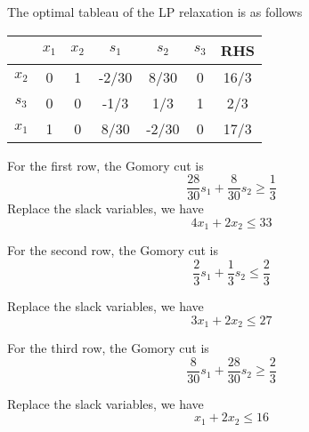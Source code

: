                 The optimal tableau of the LP relaxation is as follows

                \begin{table}[H]
                    \centering
                    \begin{tabular}{c|ccccc|c}
                        & $x_1$ & $x_2$ & $s_1$ & $s_2$ & $s_3$ & RHS\\
                        \hline
                        $x_2$ & 0 & 1 & -2/30 & 8/30 & 0 & 16/3\\
                        $s_3$ & 0 & 0 & -1/3 & 1/3 & 1 & 2/3\\
                        $x_1$ & 1 & 0 & 8/30 & -2/30 & 0 & 17/3
                    \end{tabular}
                \end{table}

                For the first row, the Gomory cut is
                \begin{equation*}
                    \frac{28}{30} s_1 + \frac{8}{30} s_2 \ge \frac{1}{3}
                \end{equation*}
                Replace the slack variables, we have
                \begin{equation*}
                    4 x_1 + 2 x_2 \le 33
                \end{equation*}

                For the second row, the Gomory cut is
                \begin{equation*}
                    \frac{2}{3} s_1 + \frac{1}{3} s_2 \le \frac{2}{3}
                \end{equation*}

                Replace the slack variables, we have
                \begin{equation*}
                    3 x_1 + 2 x_2 \le 27
                \end{equation*}

                For the third row, the Gomory cut is
                \begin{equation*}
                    \frac{8}{30}s_1 + \frac{28}{30}s_2 \ge \frac{2}{3}
                \end{equation*}

                Replace the slack variables, we have
                \begin{equation*}
                    x_1 + 2 x_2 \le 16
                \end{equation*}

